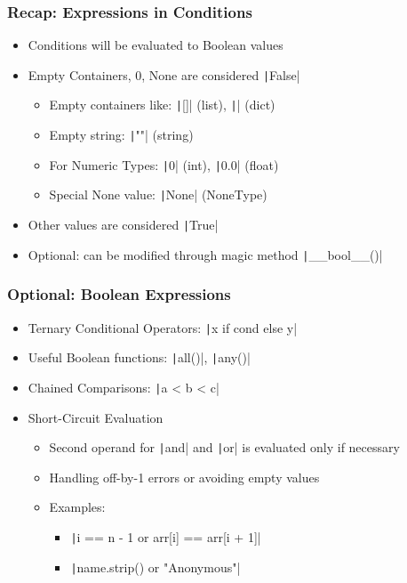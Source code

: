 \documentclass{beamer}
\begin{document}
\begin{frame}[fragile]
    \frametitle{Recap: Expressions in Conditions}
    \begin{itemize}
        \item Conditions will be evaluated to Boolean values
        \item Empty Containers, 0, None are considered \texttt|False|
              \begin{itemize}
                  \item Empty containers like: \texttt|[]| (list), \texttt|{}| (dict)
                  \item Empty string: \texttt|""| (string)
                  \item For Numeric Types: \texttt|0| (int), \texttt|0.0| (float)
                  \item Special None value: \texttt|None| (NoneType)
              \end{itemize}
        \item Other values are considered \texttt|True|
        \item Optional: can be modified through magic method \texttt|__bool__()|
    \end{itemize}
\end{frame}

\begin{frame}[fragile]
    \frametitle{Optional: Boolean Expressions}
    \begin{itemize}
        \item Ternary Conditional Operators: \texttt|x if cond else y|
        \item Useful Boolean functions: \texttt|all()|, \texttt|any()|
        \item Chained Comparisons: \texttt|a < b < c|
        \item Short-Circuit Evaluation
              \begin{itemize}
                  \item Second operand for \texttt|and| and \texttt|or| is evaluated only if necessary
                  \item Handling off-by-1 errors or avoiding empty values
                  \item Examples:
                        \begin{itemize}
                            \item \texttt|i == n - 1 or arr[i] == arr[i + 1]|
                            \item \texttt|name.strip() or "Anonymous"|
                        \end{itemize}
              \end{itemize}
    \end{itemize}


\end{frame}
\end{document}
